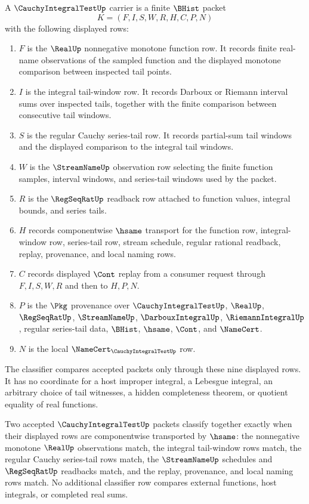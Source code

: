 \begin{definition}
\label{def:cauchy-integral-test-carrier}
A $\CauchyIntegralTestUp$ carrier is a finite $\BHist$ packet
$$
K=(F,I,S,W,R,H,C,P,N)
$$
with the following displayed rows:
\begin{enumerate}
\item $F$ is the $\RealUp$ nonnegative monotone function row. It records finite real-name observations of the sampled function and the displayed monotone comparison between inspected tail points.
\item $I$ is the integral tail-window row. It records Darboux or Riemann interval sums over inspected tails, together with the finite comparison between consecutive tail windows.
\item $S$ is the regular Cauchy series-tail row. It records partial-sum tail windows and the displayed comparison to the integral tail windows.
\item $W$ is the $\StreamNameUp$ observation row selecting the finite function samples, interval windows, and series-tail windows used by the packet.
\item $R$ is the $\RegSeqRatUp$ readback row attached to function values, integral bounds, and series tails.
\item $H$ records componentwise $\hsame$ transport for the function row, integral-window row, series-tail row, stream schedule, regular rational readback, replay, provenance, and local naming rows.
\item $C$ records displayed $\Cont$ replay from a consumer request through $F,I,S,W,R$ and then to $H,P,N$.
\item $P$ is the $\Pkg$ provenance over $\CauchyIntegralTestUp$, $\RealUp$, $\RegSeqRatUp$, $\StreamNameUp$, $\DarbouxIntegralUp$, $\RiemannIntegralUp$, regular series-tail data, $\BHist$, $\hsame$, $\Cont$, and $\NameCert$.
\item $N$ is the local $\NameCert_{\CauchyIntegralTestUp}$ row.
\end{enumerate}
The classifier compares accepted packets only through these nine displayed rows. It has no coordinate for a host improper integral, a Lebesgue integral, an arbitrary choice of tail witnesses, a hidden completeness theorem, or quotient equality of real functions.
\end{definition}

\begin{definition}
\label{def:cauchy-integral-test-classifier}
Two accepted $\CauchyIntegralTestUp$ packets classify together exactly when their displayed rows are componentwise transported by $\hsame$: the nonnegative monotone $\RealUp$ observations match, the integral tail-window rows match, the regular Cauchy series-tail rows match, the $\StreamNameUp$ schedules and $\RegSeqRatUp$ readbacks match, and the replay, provenance, and local naming rows match.
No additional classifier row compares external functions, host integrals, or completed real sums.
\end{definition}

